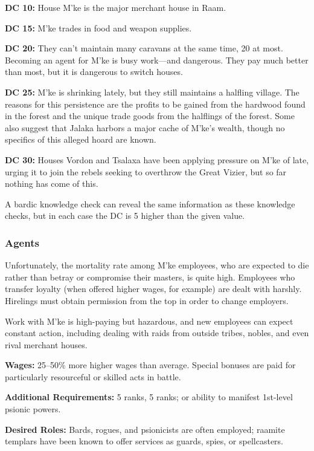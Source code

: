 \textbf{DC 10:} House M'ke is the major merchant house in Raam.

\textbf{DC 15:} M'ke trades in food and weapon supplies.

\textbf{DC 20:} They can't maintain many caravans at the same time, 20 at most. Becoming an agent for M'ke is busy work---and dangerous. They pay much better than most, but it is dangerous to switch houses.

\textbf{DC 25:} M'ke is shrinking lately, but they still maintains a halfling village. The reasons for this persistence are the profits to be gained from the hardwood found in the forest and the unique trade goods from the halflings of the forest. Some also suggest that Jalaka harbors a major cache of M'ke's wealth, though no specifics of this alleged hoard are known.

\textbf{DC 30:} Houses Vordon and Tsalaxa have been applying pressure on M'ke of late, urging it to join the rebels seeking to overthrow the Great Vizier, but so far nothing has come of this.

A bardic knowledge check can reveal the same information as these knowledge checks, but in each case the DC is 5 higher than the given value.

\subsubsection{Agents}
Unfortunately, the mortality rate among M'ke employees, who are expected to die rather than betray or compromise their masters, is quite high. Employees who transfer loyalty (when offered higher wages, for example) are dealt with harshly. Hirelings must obtain permission from the top in order to change employers.

Work with M'ke is high-paying but hazardous, and new employees can expect constant action, including dealing with raids from outside tribes, nobles, and even rival merchant houses.

\textbf{Wages:} 25--50\% more higher wages than average. Special bonuses are paid for particularly resourceful or skilled acts in battle.

\textbf{Additional Requirements:}  5 ranks,  5 ranks; or ability to manifest 1st-level psionic powers.

\textbf{Desired Roles:} Bards, rogues, and psionicists are often employed; raamite templars have been known to offer services as guards, spies, or spellcasters.